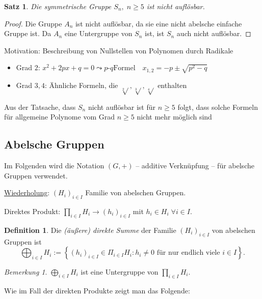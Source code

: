 \documentclass[12pt]{scrartcl} %
\newtheorem{thm}{Satz}
\theoremstyle{definition}
\newtheorem*{defn}{Definition}
\theoremstyle{remark}
\newtheorem*{nb}{Bemerkung}
\begin{document}
\begin{thm}
	Die symmetrische Gruppe $S_n,\;n\geq 5$ ist nicht auflösbar.
\end{thm}

\begin{proof}
	Die Gruppe $A_n$ ist nicht auflösbar, da sie eine nicht abelsche einfache Gruppe ist. Da $A_n$ eine Untergruppe von $S_n$ ist, ist $S_n$ auch nicht auflösbar.
\end{proof}


Motivation: Beschreibung von Nullstellen von Polynomen durch Radikale
\begin{itemize}
  \item Grad $2$: $x^2 + 2px + q = 0 \leadsto p\text{-}q\text{Formel} \quad x_{1,2} = -p \pm \sqrt{p^{2} - q} $
  \item Grad $3,4$: Ähnliche Formeln, die $\sqrt[2]{}, \sqrt[3]{}, \sqrt[4]{}$ enthalten
\end{itemize}

Aus der Tatsache, dass $S_n$ nicht auflösbar ist für $n \geq 5$ folgt, dass solche Formeln für allgemeine Polynome vom Grad $n \geq 5$ nicht mehr möglich sind

\subsection{Abelsche Gruppen}

Im Folgenden wird die Notation $(G,+)$ -- additive Verknüpfung -- für abelsche Gruppen verwendet.

\underline{Wiederholung}: $(H_i)_{i \in I}$ Familie von abelschen Gruppen.

Direktes Produkt: $\prod_{i \in I} H_i \to (h_i)_{i \in I}$ mit $h_i \in H_i \; \forall i \in I$.

\begin{defn}
  Die \emph{(äußere) direkte Summe} der Familie $(H_i)_{i \in I}$ von abelschen Gruppen ist 
  \[ \bigoplus_{i \in I} H_i := \left\{ (h_i)_{i \in I} \in \Pi_{i \in I} H_i : h_i \neq 0 \text{ für nur endlich viele $i \in I$}\right\}. \]
\end{defn}

\begin{nb}
  $\bigoplus_{i \in I} H_i$ ist eine Untergruppe von $\prod_{i \in I} H_i$.
\end{nb}

Wie im Fall der direkten Produkte zeigt man das Folgende:
\end{document}
